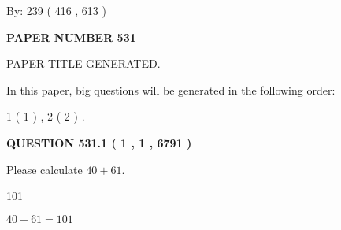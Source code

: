 \documentclass[12pt]{article}
\begin{document}
   
\hspace{1.0in} By: 
 239 ( 416 ,  613 )
   
   
   
   
\newpage 
\setcounter{page}{ 
   531001 } 
   
   
   
   
 {\textbf{ \Large{ PAPER NUMBER  531  }}}
   
   
\vspace{0.2in}
   
   
   
   
   
   
   
   
 \vspace{0.2in}
 
 
 
 
   
   
 PAPER TITLE GENERATED.
   
   
   
\vspace{0.2in}
   
In this paper, big questions will be generated in the following order: 
   
   
   1 ( 1 )
 ,
   2 ( 2 )
 .
  
\vspace{0.2in}
  
{\textbf{\Large{QUESTION
531.1 
 ( 1 , 1 , 6791 )
}}}
  
  
 
Please calculate $ %
40 +  %
61 $.
 
 
 
\noindent{}
 
 

101
 
 
\noindent{}
 
 

 
 
 
\noindent{}
 
 

$ %
40 +  %
61=   %
101$
 
 
\noindent{}
 
\end{document}
